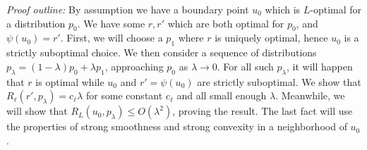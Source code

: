 \documentclass{article}
\theoremstyle{definition}\newtheorem{definition}{Definition}
\theoremstyle{definition}\newtheorem{assumption}{Assumption}
\begin{document}
\emph{Proof outline:} By assumption we have a boundary point $u_0$ which is $L$-optimal for a distribution $p_0$.
We have some $r,r'$ which are both optimal for $p_0$, and $\psi(u_0) = r'$.
First, we will choose a $p_1$ where $r$ is uniquely optimal, hence $u_0$ is a strictly suboptimal choice.
We then consider a sequence of distributions $p_{\lambda} = (1-\lambda) p_0 + \lambda p_1$, approaching $p_0$ as $\lambda \to 0$.
For all such $p_{\lambda}$, it will happen that $r$ is optimal while $u_0$ and $r' = \psi(u_0)$ are strictly suboptimal.
We show that $R_{\ell}(r', p_{\lambda}) = c_{\ell} \lambda$ for some constant $c_{\ell}$ and all small enough $\lambda$.
Meanwhile, we will show that $R_L(u_0, p_{\lambda}) \leq O(\lambda^2)$, proving the result.
The last fact will use the properties of strong smoothness and strong convexity in a neighborhood of $u_0$.
\end{document}
